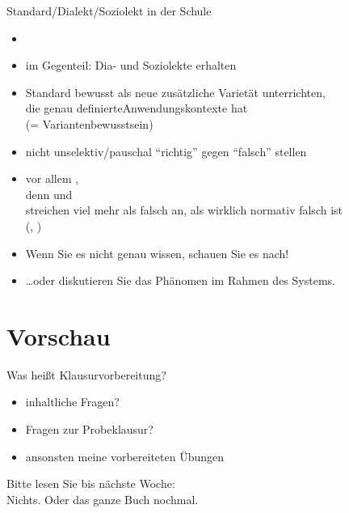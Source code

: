 \begin{frame}
  {Standard\slash Dialekt\slash Soziolekt in der Schule}
  \pause
  \begin{itemize}[<+->]
    \item {}
    \item im Gegenteil: \alert{Dia- und Soziolekte erhalten}
    \item Standard \alert{bewusst als neue zusätzliche Varietät} unterrichten,\\
      die genau definierte\alert{Anwendungskontexte} hat\\
      (= Variantenbewusstsein)
      \Halbzeile
    \item nicht unselektiv\slash pauschal "`richtig"' gegen "`falsch"' stellen
    \item vor allem ,\\
      denn  und\\
      streichen viel mehr als falsch an, als wirklich normativ falsch ist\\
      (\citealt[4--7]{Eisenberg2004}, \citealt[319--324]{Haecker2009})
      \Halbzeile
    \item \alert{Wenn Sie es nicht genau wissen, schauen Sie es nach!}
    \item \ldots oder diskutieren Sie das Phänomen im Rahmen des Systems.
  \end{itemize}
\end{frame}


\section{Vorschau}

\begin{frame}
  {Was heißt Klausurvorbereitung?}
  \pause
  \begin{itemize}[<+->]
    \item inhaltliche Fragen?
    \item Fragen zur Probeklausur?
    \item ansonsten meine vorbereiteten Übungen
  \end{itemize}
  \pause
  \Halbzeile
  \begin{center}
    Bitte lesen Sie bis nächste Woche:\\
    \alert{Nichts. Oder das ganze Buch nochmal.}
  \end{center}
\end{frame}

